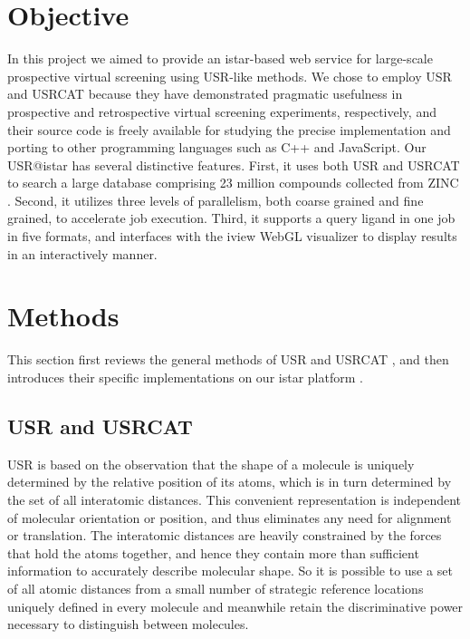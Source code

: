 \section{Objective}

In this project we aimed to provide an istar-based \citep{1362} web service for large-scale prospective virtual screening using USR-like methods. We chose to employ USR \citep{1379} and USRCAT \citep{1331} because they have demonstrated pragmatic usefulness in prospective \citep{1380,1281,1504,1502} and retrospective \citep{1331} virtual screening experiments, respectively, and their source code is freely available for studying the precise implementation and porting to other programming languages such as C++ and JavaScript. Our USR@istar has several distinctive features. First, it uses both USR and USRCAT to search a large database comprising 23 million compounds collected from ZINC \citep{532,1178}. Second, it utilizes three levels of parallelism, both coarse grained and fine grained, to accelerate job execution. Third, it supports a query ligand in one job in five formats, and interfaces with the iview \citep{1366} WebGL visualizer to display results in an interactively manner.

\section{Methods}

This section first reviews the general methods of USR \citep{1379} and USRCAT \citep{1331}, and then introduces their specific implementations on our istar platform \citep{1362}.

\subsection{USR and USRCAT}

USR is based on the observation that the shape of a molecule is uniquely determined by the relative position of its atoms, which is in turn determined by the set of all interatomic distances. This convenient representation is independent of molecular orientation or position, and thus eliminates any need for alignment or translation. The interatomic distances are heavily constrained by the forces that hold the atoms together, and hence they contain more than sufficient information to accurately describe molecular shape. So it is possible to use a set of all atomic distances from a small number of strategic reference locations uniquely defined in every molecule and meanwhile retain the discriminative power necessary to distinguish between molecules.


